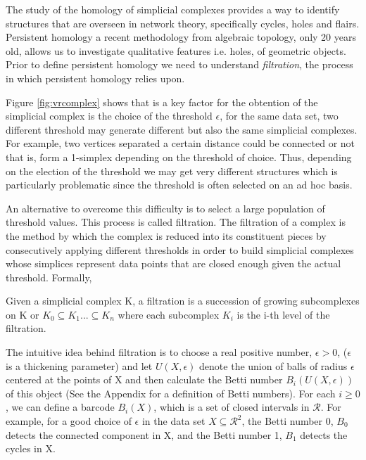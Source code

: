 \documentclass[onecollarge,runningheads]{svjour2}
\begin{document}
The study of the homology of simplicial complexes provides a way to identify structures that are overseen in network theory, specifically cycles, holes and flairs. Persistent homology a recent methodology from algebraic topology, only 20 years old, allows us to investigate qualitative features i.e. holes, of geometric objects. Prior to define persistent homology we need to understand \emph{filtration}, the process in which persistent homology relies upon.

Figure \ref{fig:vrcomplex} shows that  is a key factor for the obtention of the simplicial complex is the choice of the threshold $\epsilon$, for the same data set, two different threshold may generate 
different but also the same simplicial complexes. For example, two vertices separated a certain distance could be connected or not that is, form a 1-simplex depending on the threshold of choice.
Thus, depending on the election of the threshold we may get very different structures which is particularly problematic since the threshold is often selected on an ad hoc basis. 

An alternative to overcome this difficulty is to select a large population of threshold values. This process is called filtration. The filtration of a complex is the method by which the complex is reduced into its constituent pieces by consecutively applying different thresholds in order to build simplicial complexes whose simplices represent data points that are closed enough given the actual threshold. Formally,
\begin{definition}
Given a simplicial complex K, a filtration is a succession of growing subcomplexes on K or $K_0 \subseteq K_1 ...   \subseteq K_n$ where each subcomplex $K_i$ is the i-th level of the filtration.
\end{definition}

The intuitive idea behind filtration is to choose a real positive number, $\epsilon > 0$, ($\epsilon$ is a thickening parameter) and let $U(X,\epsilon)$ denote the union of balls of radius $\epsilon$ centered at the points of X and then calculate the Betti number $B_i(U(X,\epsilon))$ of this object (See the Appendix for a definition of Betti numbers). For each $i \geq 0$, we can define a barcode $B_i(X)$, which is a set of closed intervals in $\mathcal{R}$. For example, for a good choice of $\epsilon$ in the data set $X \subseteq \mathcal{R}^2$, the Betti number 0, $B_0$ detects the connected component in X, and the Betti number 1, $B_1$ detects the cycles in X.
\end{document}
